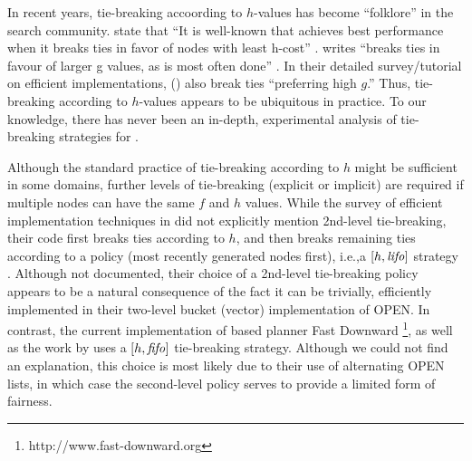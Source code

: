 In recent years, tie-breaking accoording to $h$-values has become ``folklore'' in the search community.
\citeauthor{hansen2007anytime} state that ``It is well-known 
that \astar achieves best performance when it breaks ties
in favor of nodes with least h-cost'' \cite{hansen2007anytime}.
\citeauthor{holte2010common} writes ``\astar breaks ties in favour
of larger g values, as is most often done'' \cite[note that since $f=g+h$,
preferring large $g$ is equivalent to preferring smaller $h$]{holte2010common}.
In their detailed survey/tutorial on efficient \astar implementations,
\citeauthor{burns2012implementing} (\citeyear{burns2012implementing})
also break ties ``preferring high $g$.''
Thus, tie-breaking according to $h$-values appears
to be ubiquitous in practice.
To our knowledge, there has never been an in-depth, experimental analysis of tie-breaking strategies for \astar.

Although the standard practice of tie-breaking according to $h$ might be
sufficient in some domains, further levels of tie-breaking (explicit or
implicit) are required if multiple nodes can have the same $f$ and
$h$ values.
While the survey of efficient \astar implementation techniques in \citeauthor{burns2012implementing} did not explicitly mention 2nd-level tie-breaking, their code first breaks ties according to $h$, and then breaks remaining ties according to a \lifo policy (most recently generated nodes first), i.e.,a $[h,\mbox{\textit{lifo}}]$ strategy \cite{burnscode}. %
Although not documented, their choice of a \lifo 2nd-level tie-breaking policy appears to be a natural consequence of the fact it can be trivially, efficiently implemented in their two-level bucket (vector) implementation of OPEN.
In contrast, the current implementation of \sota \astar based planner Fast
Downward \cite{Helmert2006}\footnote{http://www.fast-downward.org}, as well as 
the work by \cite{RogerH10} uses a $[h,\mbox{\textit{fifo}}]$ tie-breaking strategy.
Although we could not find an explanation, this choice is most likely due to their use of alternating OPEN lists, in which case the \fifo second-level policy serves to provide a limited form of fairness.



